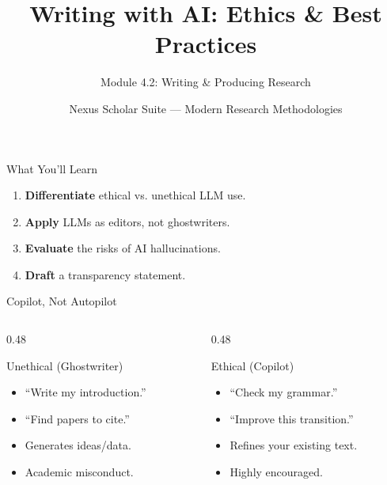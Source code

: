 \documentclass[aspectratio=169]{beamer}
\title{Writing with AI: Ethics \& Best Practices}
\subtitle{Module 4.2: Writing \& Producing Research}
\author{Nexus Scholar Suite --- Modern Research Methodologies}
\date{}
\begin{document}
\begin{frame}[plain]
  \titlepage
\end{frame}

\begin{frame}{What You'll Learn}
  \begin{enumerate}
    \item \textbf{Differentiate} ethical vs. unethical LLM use.
    \item \textbf{Apply} LLMs as editors, not ghostwriters.
    \item \textbf{Evaluate} the risks of AI hallucinations.
    \item \textbf{Draft} a transparency statement.
  \end{enumerate}
\end{frame}

\begin{frame}{Copilot, Not Autopilot}
  \begin{columns}[T]
    \begin{column}{0.48\textwidth}
      \begin{alertblock}{Unethical (Ghostwriter)}
        \begin{itemize}
          \item ``Write my introduction.''
          \item ``Find papers to cite.''
          \item Generates ideas/data.
          \item Academic misconduct.
        \end{itemize}
      \end{alertblock}
    \end{column}
    \begin{column}{0.48\textwidth}
      \begin{exampleblock}{Ethical (Copilot)}
        \begin{itemize}
          \item ``Check my grammar.''
          \item ``Improve this transition.''
          \item Refines your existing text.
          \item Highly encouraged.
        \end{itemize}
      \end{exampleblock}
    \end{column}
  \end{columns}
\end{frame}
\end{document}

